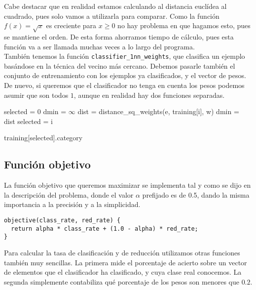 \documentclass[12pt]{article}
\begin{document}
Cabe destacar que en realidad estamos calculando al distancia euclídea al cuadrado, pues solo vamos a utilizarla para comparar. Como la función $f(x)=\sqrt{x}$ es creciente para $x\geq 0$ no hay problema en que hagamos esto, pues se mantiene el orden. De esta forma ahorramos tiempo de cálculo, pues esta función va a ser llamada muchas veces a lo largo del programa.\\

También tenemos la función \verb|classifier_1nn_weights|, que clasifica un ejemplo basándose en la técnica del vecino más cercano. Debemos pasarle también el conjunto de entrenamiento con los ejemplos ya clasificados, y el vector de pesos. De nuevo, si queremos que el clasificador no tenga en cuenta los pesos podemos asumir que son todos $1$, aunque en realidad hay dos funciones separadas.

\begin{algorithm}[h]
\begin{algorithmic}

     \State selected = $0$
     \State dmin = $\infty$
       
            \State dist = distance\_sq\_weights(e, training[i], w)
                \State dmin = dist
                \State selected = i

   \Return training[selected].category
\EndFunction

\end{algorithmic}
\end{algorithm}

\subsection*{Función objetivo}

La función objetivo que queremos maximizar se implementa tal y como se dijo en la descripción del problema, donde el valor $\alpha$ prefijado es de 0.5, dando la misma importancia a la precisión y a la simplicidad.

\begin{verbatim}
objective(class_rate, red_rate) {
  return alpha * class_rate + (1.0 - alpha) * red_rate;
}
\end{verbatim}

Para calcular la tasa de clasificación y de reducción utilizamos otras funciones también muy sencillas. La primera mide el porcentaje de acierto sobre un vector de elementos que el clasificador ha clasificado, y cuya clase real conocemos. La segunda simplemente contabiliza qué porcentaje de los pesos son menores que $0.2$.
\end{document}
